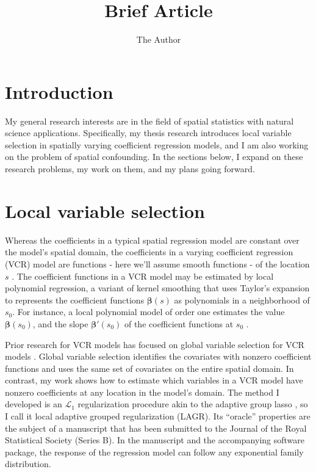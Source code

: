 \documentclass[11pt, oneside]{article}   	%
\title{Brief Article}
\author{The Author}
\begin{document}
\maketitle


\section*{Introduction}\label{introduction}

My general research interests are in the field of spatial statistics
with natural science applications. Specifically, my thesis research
introduces local variable selection in spatially varying coefficient
regression models, and I am also working on the problem of spatial
confounding. In the sections below, I expand on these research problems,
my work on them, and my plans going forward.

\section*{Local variable selection}\label{local-variable-selection}

Whereas the coefficients in a typical spatial regression model are
constant over the model's spatial domain, the coefficients in a varying
coefficient regression (VCR) model are functions - here we'll assume
smooth functions - of the location \(s\) \citep{Hastie-Tibshirani-1993}.
The coefficient functions in a VCR model may be estimated by local
polynomial regression, a variant of kernel smoothing that uses Taylor's
expansion to represents the coefficient functions \(\bm{\beta}(s)\) as
polynomials in a neighborhood of \(s_0\). For instance, a local
polynomial model of order one estimates the value \(\bm{\beta}(s_0)\),
and the slope \(\bm{\beta}'(s_0)\) of the coefficient functions at
\(s_0\) \citep{Fan-Gijbels-1996,Fan-Zhang-1999}.

Prior research for VCR models has focused on global variable selection
for VCR models \citep{Wang-Li-Huang-2008,Wang-Xia-2009,Wei-Huang-Li-2011}. Global variable selection identifies the
covariates with nonzero coefficient functions and uses the same set of
covariates on the entire spatial domain. In contrast, my work shows how
to estimate which variables in a VCR model have nonzero coefficients at
any location in the model's domain. The method I developed is an
\(\mathcal{L}_1\) regularization procedure akin to the adaptive group
lasso \citep{Wang-Leng-2008}, so I call it local adaptive grouped
regularization (LAGR). Its ``oracle'' properties are the subject of a
manuscript that has been submitted to the Journal of the Royal
Statistical Society (Series B). In the manuscript and the accompanying
software package, the response of the regression model can follow any
exponential family distribution.
\end{document}
